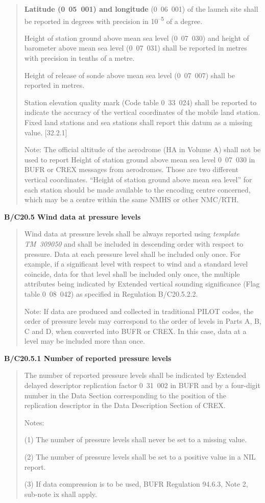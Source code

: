 \begin{quote}
\textbf{Latitude (0}~\textbf{05~001) and longitude} (0~06~001) of the launch site shall be reported in degrees with precision in 10\textsuperscript{--5} of a degree.

Height of station ground above mean sea level (0~07~030) and height of barometer above mean sea level (0~07~031) shall be reported in metres with precision in tenths of a metre.

Height of release of sonde above mean sea level (0~07~007) shall be reported in metres.

Station elevation quality mark (Code table 0~33~024) shall be reported to indicate the accuracy of the vertical coordinates of the mobile land station. Fixed land stations and sea stations shall report this datum as a missing value. {[}32.2.1{]}

Note: The official altitude of the aerodrome (HA in Volume A) shall not be used to report Height of station ground above mean sea level 0~07~030 in BUFR or CREX messages from aerodromes. Those are two different vertical coordinates. ``Height of station ground above mean sea level'' for each station should be made available to the encoding centre concerned, which may be a centre within the same NMHS or other NMC/RTH.
\end{quote}

\textbf{B/C20.5 Wind data at pressure levels}

\begin{quote}
Wind data at pressure levels shall be always reported using \emph{template TM~309050} and shall be included in descending order with respect to pressure. Data at each pressure level shall be included only once. For example, if a significant level with respect to wind and a standard level coincide, data for that level shall be included only once, the multiple attributes being indicated by Extended vertical sounding significance (Flag table 0~08~042) as specified in Regulation B/C20.5.2.2.

Note: If data are produced and collected in traditional PILOT codes, the order of pressure levels may correspond to the order of levels in Parts A, B, C and D, when converted into BUFR or CREX. In this case, data at a level may be included more than once.
\end{quote}

\textbf{B/C20.5.1 Number of reported pressure levels}

\begin{quote}
The number of reported pressure levels shall be indicated by Extended delayed descriptor replication factor 0~31~002 in BUFR and by a four-digit number in the Data Section corresponding to the position of the replication descriptor in the Data Description Section of CREX.

Notes:

(1) The number of pressure levels shall never be set to a missing value.

(2) The number of pressure levels shall be set to a positive value in a NIL report.

(3) If data compression is to be used, BUFR Regulation 94.6.3, Note 2, sub-note ix shall apply.
\end{quote}

